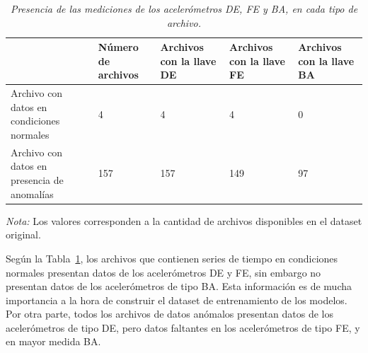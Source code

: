 \documentclass[11pt,a4paper,spanish]{book}
\numberwithin{equation}{chapter}
\numberwithin{figure}{chapter}
\begin{document}
\begin{table}[h]
\caption{\textit{Presencia de las mediciones de los acelerómetros DE, FE y BA, en cada tipo de archivo.}}
\centering
\footnotesize
\renewcommand{\arraystretch}{1.5} %
\begin{tabularx}{\textwidth}{|l|X|X|X|X|}
    \hline
    \textbf{} & 
    \textbf{Número de archivos} & 
    \textbf{Archivos con la llave DE} & 
    \textbf{Archivos con la llave FE} & 
    \textbf{Archivos con la llave BA} \\
    \hline
    Archivo con datos en condiciones normales & 4 & 4 & 4 & 0 \\
    \hline
    Archivo con datos en presencia de anomalías & 157 & 157 & 149 & 97 \\
    \hline
\end{tabularx}

\label{tab:tab1keys}
\vspace{2mm}
\parbox{\textwidth}{\footnotesize \textit{Nota:} Los valores corresponden a la cantidad de archivos disponibles en el dataset original.}
\end{table}



Según la Tabla~\ref{tab:tab1keys}, los archivos que contienen series de tiempo en 
condiciones normales presentan datos de los acelerómetros DE y FE, sin embargo no 
presentan datos de los acelerómetros de tipo BA. Esta información es de mucha 
importancia a la hora de construir el dataset de entrenamiento de los modelos. 
Por otra parte, todos los archivos de datos anómalos presentan datos de los 
acelerómetros de tipo DE, pero datos faltantes en los acelerómetros de tipo FE, y 
en mayor medida BA. 
\end{document}

